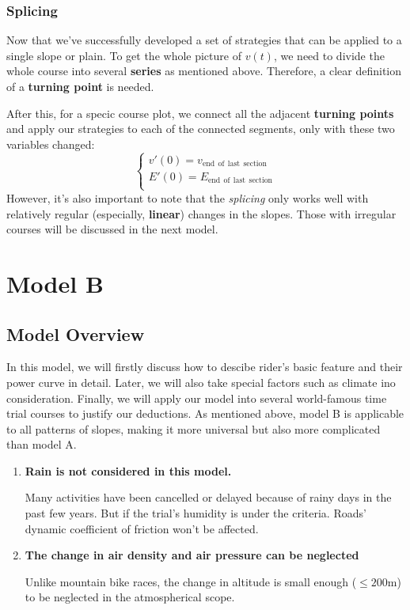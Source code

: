 \documentclass[12pt]{article}
\theoremstyle{definition}
\theoremstyle{remark}
\numberwithin{equation}{section}
\begin{document}
	\subsubsection{Splicing}
			Now that we've successfully developed a set of strategies that can be applied to a single slope or plain. To get the whole picture of $v(t)$, we need to divide the whole course into several \textbf{series} as mentioned above. Therefore, a clear definition of a \textbf{turning point} is needed.

			After this, for a specic course plot, we connect all the adjacent \textbf{turning points} and apply our strategies to each of the connected segments, only with these two variables changed:
			$$
			\left\{ \begin{array}{c}
				v\prime\left( 0 \right) =v_{\mathrm{end}\:\:\mathrm{of}\:\:\mathrm{last}\:\:\mathrm{section}}\\
				E\prime\left( 0 \right) =E_{\mathrm{end}\:\:\mathrm{of}\:\:\mathrm{last}\:\:\mathrm{section}}\\
			\end{array} \right.
			$$
			However, it's also important to note that the \textit{splicing} only works well with relatively regular (especially, \textbf{linear}) changes in the slopes. Those with irregular courses will be discussed in the next model.

	
	\section{Model B}
	\subsection{Model Overview}
	In this model, we will firstly discuss how to descibe rider's basic feature and their power curve in detail. Later, we will also take special factors such as climate ino consideration. Finally, we will apply our model into several world-famous time trial courses to justify our deductions. As mentioned above, model B is applicable to all patterns of slopes, making it more universal but also more complicated than model A.
	\begin{enumerate}
		\item	\textbf{Rain is not considered in this model.}

				Many activities have been cancelled or delayed because of rainy days in the past few years. But if the trial's humidity is under the criteria. Roads' dynamic coefficient of friction won't be affected.
		\item \textbf{The change in air density and air pressure can be neglected}

				Unlike mountain bike races, the change in altitude is small enough (\(\leq 200\mathrm{m}\)) to be neglected in the atmospherical scope.
	\end{enumerate}
\end{document}
